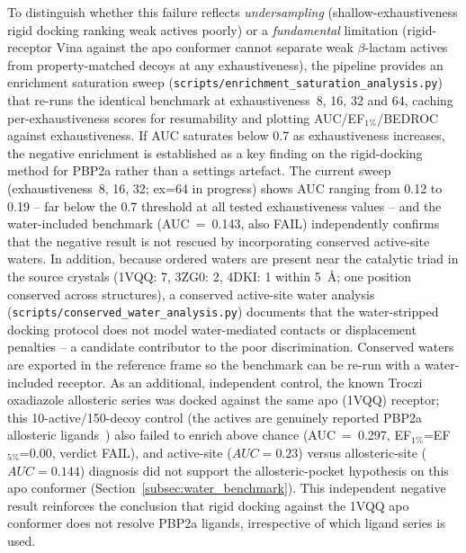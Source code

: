 \documentclass[12pt]{article}
\begin{document}
To distinguish whether this failure reflects \emph{undersampling} (shallow-exhaustiveness rigid docking ranking weak actives poorly) or a \emph{fundamental} limitation (rigid-receptor Vina against the apo conformer cannot separate weak $\beta$-lactam actives from property-matched decoys at any exhaustiveness), the pipeline provides an enrichment saturation sweep (\texttt{scripts/enrichment\_saturation\_analysis.py}) that re-runs the identical benchmark at exhaustiveness~8, 16, 32 and 64, caching per-exhaustiveness scores for resumability and plotting AUC/EF$_{1\%}$/BEDROC against exhaustiveness. If AUC saturates below 0.7 as exhaustiveness increases, the negative enrichment is established as a key finding on the rigid-docking method for PBP2a rather than a settings artefact. The current sweep (exhaustiveness~8, 16, 32; ex=64 in progress) shows AUC ranging from 0.12 to 0.19 -- far below the 0.7 threshold at all tested exhaustiveness values -- and the water-included benchmark (AUC~=~0.143, also FAIL) independently confirms that the negative result is not rescued by incorporating conserved active-site waters. In addition, because ordered waters are present near the catalytic triad in the source crystals (1VQQ: 7, 3ZG0: 2, 4DKI: 1 within 5~\si{\angstrom}; one position conserved across structures), a conserved active-site water analysis (\texttt{scripts/conserved\_water\_analysis.py}) documents that the water-stripped docking protocol does not model water-mediated contacts or displacement penalties -- a candidate contributor to the poor discrimination. Conserved waters are exported in the reference frame so the benchmark can be re-run with a water-included receptor. As an additional, independent control, the known Troczi oxadiazole allosteric series was docked against the same apo (1VQQ) receptor; this 10-active/150-decoy control (the actives are genuinely reported PBP2a allosteric ligands~\cite{troczi2013}) also failed to enrich above chance (AUC~=~0.297, EF$_{1\%}$=EF$_{5\%}$=0.00, verdict FAIL), and active-site ($AUC{=}0.23$) versus allosteric-site ($AUC{=}0.144$) diagnosis did not support the allosteric-pocket hypothesis on this apo conformer (Section~\ref{subsec:water_benchmark}). This independent negative result reinforces the conclusion that rigid docking against the 1VQQ apo conformer does not resolve PBP2a ligands, irrespective of which ligand series is used.
\end{document}
